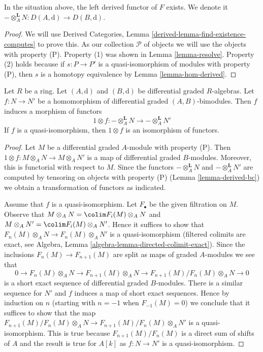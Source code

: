 \begin{lemma}
\label{lemma-derived-bc}
In the situation above, the left derived functor of $F$ exists.
We denote it
$- \otimes_A^\mathbf{L} N : D(A, \text{d}) \to D(B, \text{d})$.
\end{lemma}

\begin{proof}
We will use
Derived Categories, Lemma \ref{derived-lemma-find-existence-computes}
to prove this. As our collection $\mathcal{P}$
of objects we will use the objects with property (P).
Property (1) was shown in Lemma \ref{lemma-resolve}.
Property (2) holds because if $s : P \to P'$ is a quasi-isomorphism
of modules with property (P), then $s$ is a homotopy equivalence
by Lemma \ref{lemma-hom-derived}.
\end{proof}

\begin{lemma}
\label{lemma-functoriality-bc}
Let $R$ be a ring. Let $(A, \text{d})$ and $(B, \text{d})$ be
differential graded $R$-algebras. Let $f : N \to N'$ be a
homomorphism of differential graded $(A, B)$-bimodules.
Then $f$ induces a morphism of functors
$$
1\otimes f :
- \otimes_A^\mathbf{L} N
\longrightarrow
- \otimes_A^\mathbf{L} N'
$$
If $f$ is a quasi-isomorphism, then $1 \otimes f$ is an isomorphism of
functors.
\end{lemma}

\begin{proof}
Let $M$ be a differential graded $A$-module with property (P).
Then $1 \otimes f : M \otimes_A N \to M \otimes_A N'$ is a
map of differential graded $B$-modules. Moreover, this is functorial
with respect to $M$. Since the functors
$- \otimes_A^\mathbf{L} N$ and $- \otimes_A^\mathbf{L} N'$ are
computed by tensoring on objects with property (P)
(Lemma \ref{lemma-derived-bc}) we obtain a transformation of functors
as indicated.

\medskip\noindent
Assume that $f$ is a quasi-isomorphism. Let $F_\bullet$ be the
given filtration on $M$. Observe that
$M \otimes_A N = \colim F_i(M) \otimes_A N$ and
$M \otimes_A N' = \colim F_i(M) \otimes_A N'$.
Hence it suffices to show that
$F_n(M) \otimes_A N \to F_n(M) \otimes_A N'$
is a quasi-isomorphism (filtered colimits are exact, see
Algebra, Lemma \ref{algebra-lemma-directed-colimit-exact}).
Since the inclusions $F_n(M) \to F_{n + 1}(M)$
are split as maps of graded $A$-modules we see that
$$
0 \to F_n(M) \otimes_A N \to F_{n + 1}(M) \otimes_A N \to
F_{n + 1}(M)/F_n(M) \otimes_A N \to 0
$$
is a short exact sequence of differential graded $B$-modules.
There is a similar sequence for $N'$ and $f$ induces a map
of short exact sequences. Hence by induction on $n$ (starting with $n = -1$
when $F_{-1}(M) = 0$) we conclude that it suffices to show that
the map $F_{n + 1}(M)/F_n(M) \otimes_A N \to F_{n + 1}(M)/F_n(M) \otimes_A N'$
is a quasi-isomorphism. This is true because $F_{n + 1}(M)/F_n(M)$
is a direct sum of shifts of $A$ and the result is true for $A[k]$
as $f : N \to N'$ is a quasi-isomorphism.
\end{proof}

